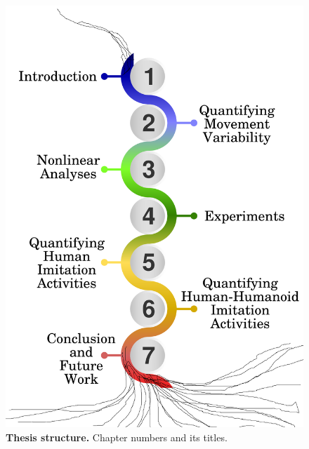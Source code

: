 \begin{figure}
\centering
\includegraphics[width=1.0\textwidth]{thesis-structure-v04}
    \caption{
	{\bf Thesis structure.}
	Chapter numbers and its titles.
	  }
    \label{fig:thesis}
\end{figure}





